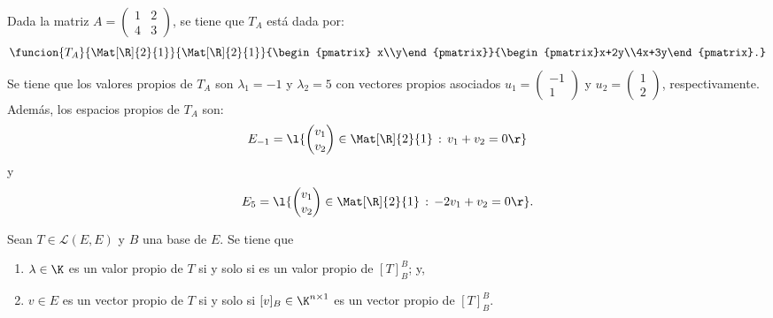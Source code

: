 \documentclass[compacto,10pt]{pubciencias-notas}
\begin{document}
\begin{ejem}\hspace{0pt}\label{Cap7:ejem02} Dada la matriz $A = \begin{pmatrix}1&2\\4&3\end{pmatrix}$, se tiene que $T_{A}$ está dada por:
\[
    \funcion{T_A}{\Mat[\R]{2}{1}}{\Mat[\R]{2}{1}}{\begin{pmatrix}
     x\\y\end{pmatrix}}{\begin{pmatrix}x+2y\\4x+3y\end{pmatrix}.}
\]
Se tiene que los valores propios de $T_{A}$ son $\lambda_{1} = -1$ y $\lambda_{2} = 5$ con vectores propios asociados $u_{1} = \begin{pmatrix}-1\\1\end{pmatrix}$ y $u_{2} = \begin{pmatrix}1\\2\end{pmatrix}$, respectivamente. Además, los espacios propios de $T_{A}$ son:
\[
    E_{-1} = \l\{\begin{pmatrix}v_{1}\\v_{2}\end{pmatrix}\in\Mat[\R]{2}{1}\,:\,v_{1}+v_{2}=0\r\}
\]
y 
\[
    E_{5} = \l\{\begin{pmatrix}v_{1}\\v_{2}\end{pmatrix}\in\Mat[\R]{2}{1}\,:\,-2v_{1}+v_{2}=0\r\}.
\]
\end{ejem}

\begin{prop}
Sean $T \in \mathscr{L}(E,E)$ y $B$ una base de $E$. Se tiene que
\begin{enumerate}
\item
    $\lambda\in\K$ es un valor propio de $T$ si y solo si es un valor propio de $[T]_B^B$; y,
\item
    $v\in E$ es un vector propio de $T$ si y solo si $[v]_{B}\in\K^{n\times1}$ es un vector propio de $[T]_B^B$.
\end{enumerate}
\end{prop}
\end{document}
